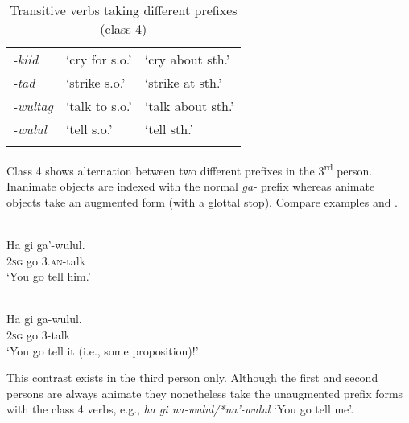 \begin{table} 
\caption{Transitive verbs taking different prefixes (class 4)}
\label{tab:10:Ref306281514}
\begin{tabularx}{\textwidth}{>{\it}XXX} 
\lsptoprule
 -{kiid} & `cry for s.o.'& `cry about sth.'\\
 -{tad} & `strike s.o.'& `strike at sth.'\\
 -{wultag}&  `talk to s.o.'& `talk about sth.'\\
 -{wulul} & `tell s.o.'& `tell sth.'\\
\lspbottomrule
\end{tabularx}
\end{table}



Class 4 shows alternation between two different prefixes in the 3\textsuperscript{rd} person. Inanimate objects are indexed with the normal \textit{ga-} prefix whereas animate objects take an augmented form (with a glottal stop). Compare examples  and .


\ea 
\label{ex:10:1246}
 \\ 
 \gll    Ha  gi  ga'-wulul.\\
   2\textsc{sg} go  3.\textsc{an}-talk  \\
 \glt  `You go tell him.'
\z
 
\ea 
\label{ex:10:1247}
 \\ 
 \gll    Ha  gi  ga-wulul.    \\
   2\textsc{sg} go  3-talk      \\
 \glt  `You go tell it (i.e., some proposition)!'
\z







This contrast exists in the third person only. Although the first and second persons are always animate they nonetheless take the unaugmented prefix forms with the class 4 verbs, e.g., \textit{ha gi na-wulul/*na'-wulul} `You go tell me'.

